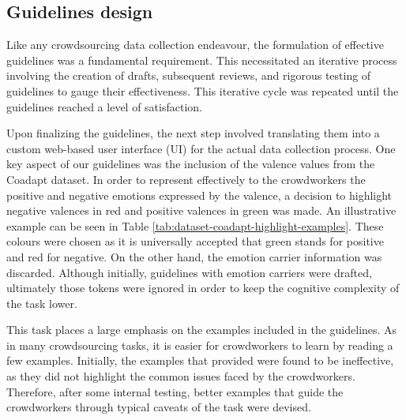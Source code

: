 \subsection{Guidelines design}
Like any crowdsourcing data collection endeavour, the formulation of effective guidelines was a fundamental requirement. This necessitated an iterative process involving the creation of drafts, subsequent reviews, and rigorous testing of guidelines to gauge their effectiveness. This iterative cycle was repeated until the guidelines reached a level of satisfaction.

Upon finalizing the guidelines, the next step involved translating them into a custom web-based user interface (UI) for the actual data collection process. One key aspect of our guidelines was the inclusion of the valence values from the Coadapt dataset. In order to represent effectively to the crowdworkers the positive and negative emotions expressed by the valence, a decision to highlight negative valences in red and positive valences in green was made. An illustrative example can be seen in Table \ref{tab:dataset-coadapt-highlight-examples}. These colours were chosen as it is universally accepted that green stands for positive and red for negative. On the other hand, the emotion carrier information was discarded. Although initially, guidelines with emotion carriers were drafted, ultimately those tokens were ignored in order to keep the cognitive complexity of the task lower.

This task places a large emphasis on the examples included in the guidelines. As in many crowdsourcing tasks, it is easier for crowdworkers to learn by reading a few examples. Initially, the examples that provided were found to be ineffective, as they did not highlight the common issues faced by the crowdworkers. Therefore, after some internal testing, better examples that guide the crowdworkers through typical caveats of the task were devised.


